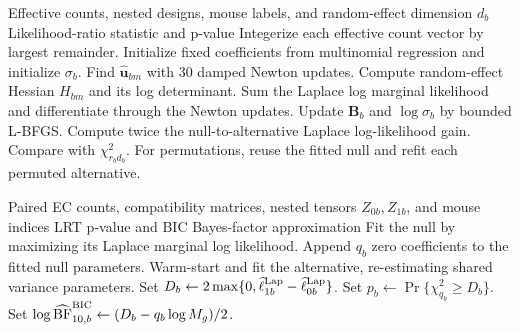 \documentclass[11pt]{article}
\newcommand{\Beta}{\bm B}
\begin{document}
\begin{algorithm}[H]
\caption{Laplace multinomial GLMM condition test}
\label{alg:glmm}
\begin{algorithmic}[1]
\Require Effective counts, nested designs, mouse labels, and random-effect dimension \(d_b\)
\Ensure Likelihood-ratio statistic and p-value
\State Integerize each effective count vector by largest remainder.
  \State Initialize fixed coefficients from multinomial regression and initialize \(\sigma_b\).
  \Repeat
      \State Find \(\widehat{\bm u}_{bm}\) with 30 damped Newton updates.
      \State Compute random-effect Hessian \(H_{bm}\) and its log determinant.
    \EndFor
    \State Sum the Laplace log marginal likelihood and differentiate through the Newton updates.
    \State Update \(\Beta_b\) and \(\log\sigma_b\) by bounded L-BFGS.
\EndFor
\State Compute twice the null-to-alternative Laplace log-likelihood gain.
\State Compare with \(\chi^2_{r_bd_b}\).
\State For permutations, reuse the fitted null and refit each permuted alternative.
\end{algorithmic}
\end{algorithm}

\begin{algorithm}[H]
\caption{Nonbootstrap paired-EC Laplace block test}
\label{alg:ec-laplace-lrt}
\begin{algorithmic}[1]
\Require Paired EC counts, compatibility matrices, nested tensors \(Z_{0b},Z_{1b}\), and mouse indices
\Ensure LRT p-value and BIC Bayes-factor approximation
\State Fit the null by maximizing its Laplace marginal log likelihood.
\State Append \(q_b\) zero coefficients to the fitted null parameters.
\State Warm-start and fit the alternative, re-estimating shared variance parameters.
\State Set \(D_b\gets 2\max\{0,\widehat\ell^{\rm Lap}_{1b} -\widehat\ell^{\rm Lap}_{0b}\}\).
\State Set \(p_b\gets\Pr\{\chi^2_{q_b}\geq D_b\}\).
\State Set \(\log\widehat{\mathrm{BF}}_{10,b}^{\rm BIC} \gets(D_b-q_b\log M_g)/2\).
\end{algorithmic}
\end{algorithm}
\end{document}
